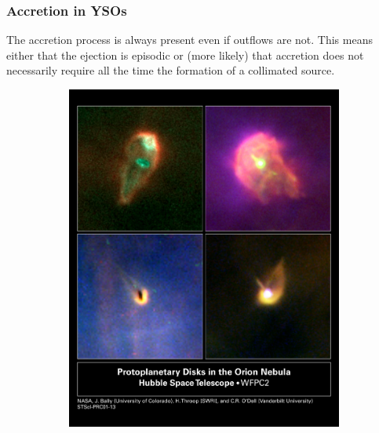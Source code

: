 \documentclass[10pt,a4paper,english]{article}
\begin{document}
\subsubsection{Accretion in YSOs}

The accretion process is always present even if outflows are not. This means
either that the ejection is episodic or (more likely) that accretion does not
necessarily require all the time the formation of a collimated source.

\begin{figure}[!ht]
  \begin{subfigure}[t]{0.395\textwidth}
    \includegraphics[width=\textwidth]{protoplanetary_disks_orion.jpg}
  \end{subfigure}
  \begin{subfigure}[t]{0.595\textwidth}

\end{subfigure}
\end{figure}
\end{document}
